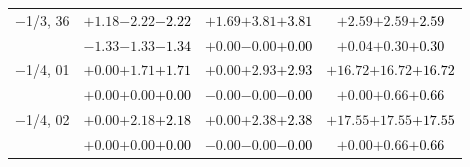 \documentclass[compress]{beamer}
\begin{document}
\begin{frame}
\begin{tabular}{r | c | c | c}
$-$1/3, 36 & $+1.18$\hspace{0.1 cm}$-2.22$\hspace{0.1 cm}\textcolor{black}{$-2.22$} & $+1.69$\hspace{0.1 cm}$+3.81$\hspace{0.1 cm}\textcolor{black}{$+3.81$} & $+2.59$\hspace{0.1 cm}$+2.59$\hspace{0.1 cm}\textcolor{black}{$+2.59$} \\
           & $-1.33$\hspace{0.1 cm}$-1.33$\hspace{0.1 cm}\textcolor{black}{$-1.34$} & $+0.00$\hspace{0.1 cm}$-0.00$\hspace{0.1 cm}\textcolor{black}{$+0.00$} & $+0.04$\hspace{0.1 cm}$+0.30$\hspace{0.1 cm}\textcolor{black}{$+0.30$} \\
$-$1/4, 01 & $+0.00$\hspace{0.1 cm}$+1.71$\hspace{0.1 cm}\textcolor{black}{$+1.71$} & $+0.00$\hspace{0.1 cm}$+2.93$\hspace{0.1 cm}\textcolor{black}{$+2.93$} & $+16.72$\hspace{0.1 cm}$+16.72$\hspace{0.1 cm}\textcolor{black}{$+16.72$} \\
           & $+0.00$\hspace{0.1 cm}$+0.00$\hspace{0.1 cm}\textcolor{black}{$+0.00$} & $-0.00$\hspace{0.1 cm}$-0.00$\hspace{0.1 cm}\textcolor{black}{$-0.00$} & $+0.00$\hspace{0.1 cm}$+0.66$\hspace{0.1 cm}\textcolor{black}{$+0.66$} \\
$-$1/4, 02 & $+0.00$\hspace{0.1 cm}$+2.18$\hspace{0.1 cm}\textcolor{black}{$+2.18$} & $+0.00$\hspace{0.1 cm}$+2.38$\hspace{0.1 cm}\textcolor{black}{$+2.38$} & $+17.55$\hspace{0.1 cm}$+17.55$\hspace{0.1 cm}\textcolor{black}{$+17.55$} \\
           & $+0.00$\hspace{0.1 cm}$+0.00$\hspace{0.1 cm}\textcolor{black}{$+0.00$} & $-0.00$\hspace{0.1 cm}$-0.00$\hspace{0.1 cm}\textcolor{black}{$-0.00$} & $+0.00$\hspace{0.1 cm}$+0.66$\hspace{0.1 cm}\textcolor{black}{$+0.66$} \\

\end{tabular}
\end{frame}
\end{document}
